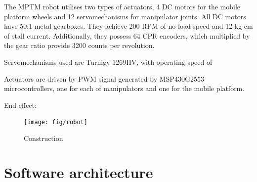 The MPTM robot utilises two types of actuators, 4 DC motors for the mobile platform wheels and 12 servomechanisms for manipulator joints. 
All DC motors have 50:1 metal gearboxes. They achieve 200 RPM of no-load speed and 12 kg cm of stall current. Additionally, they possess 64 CPR encoders, which multiplied by the gear ratio provide 3200 counts per revolution.

Servomechanisms used are Turnigy 1269HV, with operating speed of 

Actuators are driven by PWM signal generated by MSP430G2553 microcontrollers, one for each of manipulators and one for the mobile platform.

End effect:


\begin{figure}[H]
\centering
\texttt{[image: fig/robot]}
\caption{Construction}
\end{figure}

\section{Software architecture}
\label{sec:soft}

